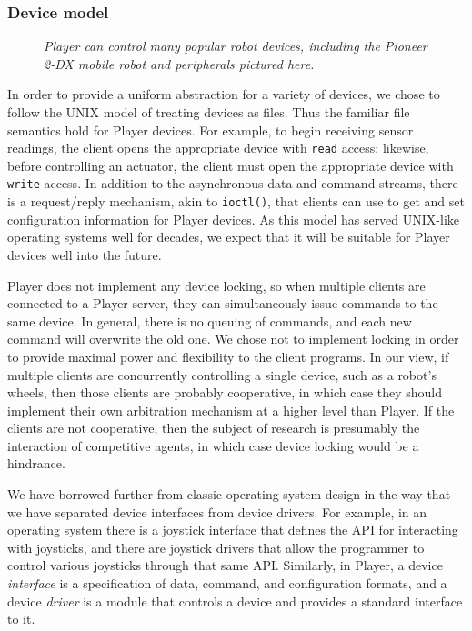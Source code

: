 \documentclass[a4paper]{ICAR2003}
\begin{document}
\subsubsection{Device model}
\label{sect:devmodel}
\begin{figure}
  \centering
  \caption{{\sl Player can control many popular robot devices, including
                the Pioneer 2-DX mobile robot and peripherals pictured here.}  \label{fig:p2dx}}
\end{figure}
In order to provide a uniform abstraction for a variety of devices, we
chose to follow the UNIX model of treating devices as files.  Thus the
familiar file semantics hold for Player devices.  For example, to
begin receiving sensor readings, the client opens the appropriate
device with {\tt read} access; likewise, before controlling an
actuator, the client must open the appropriate device with {\tt write}
access.  In addition to the asynchronous data and command streams,
there is a request/reply mechanism, akin to {\tt ioctl()}, that
clients can use to get and set configuration information for Player
devices.  As this model has served UNIX-like operating systems well
for decades, we expect that it will be suitable for Player devices well
into the future.

Player does not implement any device locking, so when multiple clients are
connected to a Player server, they can simultaneously issue commands to
the same device.
In general, there is no queuing of commands, and each new command will
overwrite the old one.  We chose not to implement locking in order to
provide maximal power and flexibility to the client programs.  In our view,
if multiple clients are concurrently controlling a single device, such as a
robot's wheels, then those clients are probably cooperative, in which case
they should implement their own arbitration mechanism at a higher level than
Player.  If the clients are not cooperative, then the subject of research
is presumably the interaction of competitive agents, in which case device
locking would be a hindrance.

We have borrowed further from classic operating system design in the way
that we have separated device interfaces from device drivers.  For example,
in an operating system there is a joystick interface that defines the API for
interacting with joysticks, and there are joystick drivers that allow the
programmer to control various joysticks through that same API.  Similarly,
in Player, a device {\em interface} is a specification of data, command, and
configuration formats, and a device {\em driver} is a module that controls a
device and provides a standard interface to it.  
\end{document}
